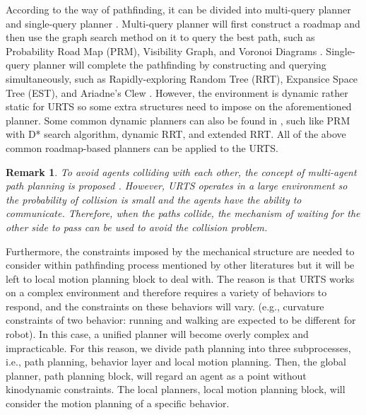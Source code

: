 \documentclass{ieeeaccess}
\newtheorem{remark}{Remark}
\begin{document}
According to the way of pathfinding, it can be divided into multi-query planner and single-query planner \cite{elbanhawi2014sampling}. Multi-query planner will first construct a roadmap and then use the graph search method on it to query the best path, such as Probability Road Map (PRM), Visibility Graph, and Voronoi Diagrams \cite{liu2018survey}. Single-query planner will complete the pathfinding by constructing and querying simultaneously,
such as Rapidly-exploring Random Tree (RRT), Expansice Space Tree (EST), and Ariadne's Clew \cite{elbanhawi2014sampling}. However, the environment is dynamic rather static for URTS so some extra structures need to impose on the aforementioned planner. Some common dynamic planners can also be found in \cite{elbanhawi2014sampling}, such like PRM with D* search algorithm, dynamic RRT, and extended RRT. All of the above common roadmap-based planners can be applied to the URTS.

\begin{remark}
    To avoid agents colliding with each other, the concept of multi-agent path planning is proposed \cite{yu2013multi}. However, URTS operates in a large environment so the probability of collision is small and the agents have the ability to communicate. Therefore, when the paths collide, the mechanism of waiting for the other side to pass can be used to avoid the collision problem.
\end{remark}

Furthermore, the constraints imposed by the mechanical structure are needed to consider within pathfinding process mentioned by other literatures but it will be left to local motion planning block to deal with. The reason is that URTS works on a complex environment and therefore requires a variety of behaviors to respond, and the constraints on these behaviors will vary. (e.g., curvature constraints of two behavior: running and walking are expected to be different for robot). In this case, a unified planner will become overly complex and impracticable. For this reason, we divide path planning into three subprocesses, i.e., path planning, behavior layer and local motion planning. Then, the global planner, path planning block, will regard an agent as a point without kinodynamic constraints. The local planners, local motion planning block, will consider the motion planning of a specific behavior.
\end{document}
